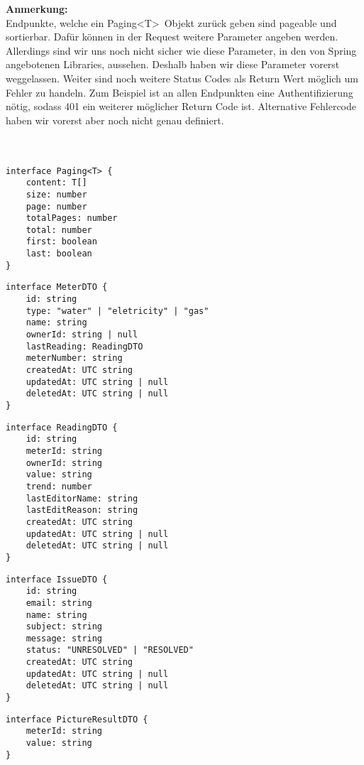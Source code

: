 \textbf{Anmerkung:} \\
Endpunkte, welche ein Paging\textless T\textgreater \  Objekt zurück geben sind pageable und sortierbar. Dafür können in der Request weitere Parameter angeben werden. Allerdings sind wir uns noch nicht sicher wie diese Parameter, in den von Spring angebotenen Libraries, aussehen. Deshalb haben wir diese Parameter vorerst weggelassen. Weiter sind noch weitere Status Codes als Return Wert möglich um Fehler zu handeln. Zum Beispiel ist an allen Endpunkten eine Authentifizierung nötig, sodass 401 ein weiterer möglicher Return Code ist. Alternative Fehlercode haben wir vorerst aber noch nicht genau definiert.  \\ \\ \\
 

\begin{lstlisting}
interface Paging<T> {
	content: T[]
	size: number
	page: number
	totalPages: number
	total: number
	first: boolean
	last: boolean
}
\end{lstlisting}


\begin{lstlisting}
interface MeterDTO {
	id: string
	type: "water" | "eletricity" | "gas"
	name: string
	ownerId: string | null
	lastReading: ReadingDTO
	meterNumber: string
	createdAt: UTC string
	updatedAt: UTC string | null
	deletedAt: UTC string | null
}
\end{lstlisting} \newpage

\begin{lstlisting}
interface ReadingDTO {
	id: string
	meterId: string
	ownerId: string
	value: string
	trend: number
	lastEditorName: string
	lastEditReason: string
	createdAt: UTC string
	updatedAt: UTC string | null
	deletedAt: UTC string | null
}
\end{lstlisting}

\begin{lstlisting}
interface IssueDTO {
	id: string
	email: string
	name: string
	subject: string
	message: string
	status: "UNRESOLVED" | "RESOLVED"
	createdAt: UTC string
	updatedAt: UTC string | null
	deletedAt: UTC string | null
}
\end{lstlisting}

\begin{lstlisting}
interface PictureResultDTO {
	meterId: string
	value: string
}
\end{lstlisting}

